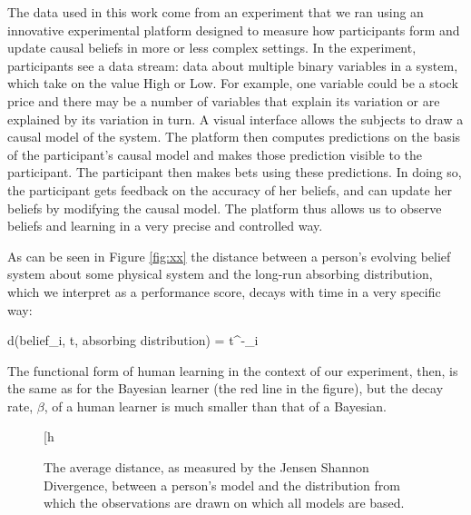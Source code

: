 The data used in this work come from an experiment that we ran using an innovative experimental platform designed to measure how participants form and update causal beliefs in more or less complex settings.  In the experiment, participants see a data stream: data about multiple binary variables in a system, which take on the value High or Low. For example, one variable could be a stock price and there may be a number of variables that explain its variation or are explained by its variation in turn.  A visual interface allows the subjects to draw a causal model of the system. The platform then computes predictions on the basis of the participant's causal model and makes those prediction visible to the participant. The participant then makes bets using these predictions. In doing so, the participant gets feedback on the accuracy of her beliefs, and can update her beliefs by modifying the causal model. The platform thus allows us to observe beliefs and learning in a very precise and controlled way.

As can be seen in Figure \ref{fig:xx} the distance between a person's evolving belief system about some physical system and the long-run absorbing distribution, which we interpret as a performance score, decays with time in a very specific way:

d(belief_{i, t}, absorbing distribution) = \alpha*t^{-\beta_i}

The functional form of human learning in the context of our experiment, then, is the same as for the Bayesian learner (the red line in the figure), but the decay rate, $\beta$, of a human learner is much smaller than that of a Bayesian. 
\vspace{1cm}
\begin{figure}[h
\label{xx}
\centerline{}
\caption{The average distance, as measured by the Jensen Shannon Divergence, between a person's model and the distribution from which the observations are drawn on which all models are based.}
\label{figure1}
\end{figure}

